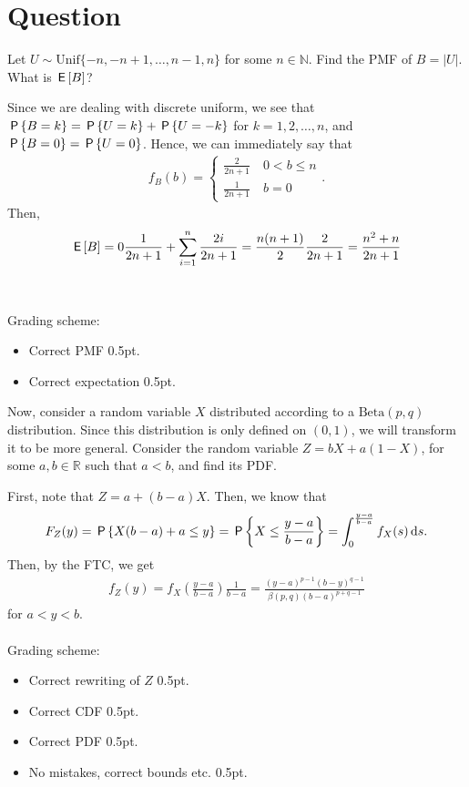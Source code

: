 \section{Question}
\begin{exercise}[1]
Let $U\sim\text{Unif}\{-n,-n+1,\dots,n-1,n\}$ for some $n\in\mathbb{N}$. Find the PMF of $B = \left|U\right|$. What is $\E{B}$?
\begin{solution}
Since we are dealing with discrete uniform, we see that $\P{B=k}=\P{U=k}+\P{U=-k}$ for $k=1,2,\dots,n$, and $\P{B=0}=\P{U=0}$. Hence, we can immediately say that
\begin{align*}
    f_B(b)=\begin{cases}
    \frac{2}{2n+1}\quad 0<b\leq n\\
    \frac{1}{2n+1}\quad b=0
    \end{cases}.
\end{align*}
Then,
\begin{align*}
    \E{B} = 0\frac{1}{2n+1}+\sum_{i=1}^n{\frac{2i}{2n+1}} = \frac{n(n+1)}{2}\frac{2}{2n+1} = \frac{n^2+n}{2n+1}
\end{align*}
\\\\
Grading scheme:
\begin{itemize}
    \item Correct PMF 0.5pt.
    \item Correct expectation 0.5pt.
\end{itemize}
\end{solution}
\end{exercise}

\begin{exercise}[2]
Now, consider a random variable $X$ distributed according to a $\text{Beta}(p,q)$ distribution. Since this distribution is only defined on $(0,1)$, we will transform it to be more general. Consider the random variable $Z = b X + a (1-X)$, for some $a,b\in\mathbb{R}$ such that $a<b$, and find its PDF.
\begin{solution}
First, note that $Z = a + (b-a)X$. Then, we know that
\begin{align*}
    F_Z(y) = \P{X(b-a)+a\leq y} = \P{X\leq \frac{y-a}{b-a}} = \int_0^{\frac{y-a}{b-a}}{f_X(s)\d s}.
\end{align*}
Then, by the FTC, we get
\begin{align*}
    f_Z(y) = f_X(\frac{y-a}{b-a})\frac{1}{b-a} = \frac{(y-a)^{p-1}(b-y)^{q-1}}{\beta(p,q)(b-a)^{p+q-1}}
\end{align*}
for $a<y<b$.
\\\\
Grading scheme:
\begin{itemize}
    \item Correct rewriting of $Z$ 0.5pt.
    \item Correct CDF 0.5pt.
    \item Correct PDF 0.5pt.
    \item No mistakes, correct bounds etc. 0.5pt.
\end{itemize}
\end{solution}
\end{exercise}

